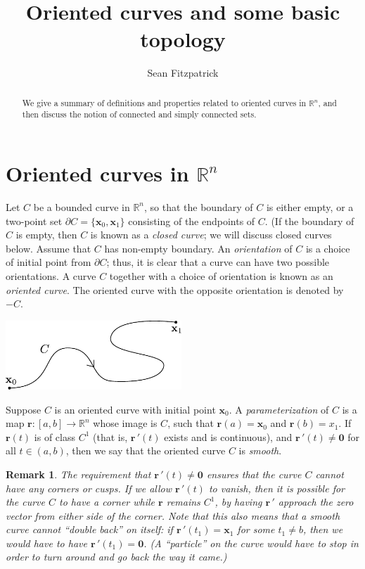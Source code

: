 \documentclass[12pt,letterpaper]{article}
\author{Sean Fitzpatrick}
\title{Oriented curves and some basic topology}
\newtheorem{rem}[theorem]{Remark}
\newenvironment{remark}{\begin{rem}\rm}{\end{rem}}
\newcommand{\R}{\mathbb{R}}
\newcommand{\x}{\mathbf{x}}
\renewcommand{\r}{\mathbf{r}}
\begin{document}
\maketitle
\begin{abstract}
We give a summary of definitions and properties related to oriented curves in $\R^n$, and then discuss the notion of connected and simply connected sets.
\end{abstract}
\section{Oriented curves in $\R^n$}
Let $C$ be a bounded curve in $\R^n$, so that the boundary of $C$ is either empty, or a two-point set $\partial C=\{\x_0,\x_1\}$ consisting of the endpoints of $C$. (If the boundary of $C$ is empty, then $C$ is known as a {\em closed curve}; we will discuss closed curves below. Assume that $C$ has non-empty boundary. An {\em orientation} of $C$ is a choice of initial point from $\partial C$; thus, it is clear that a curve can have two possible orientations. A curve $C$ together with a choice of orientation is known as an {\em oriented curve}. The oriented curve with the opposite orientation is denoted by $-C$.
\begin{center}
\includegraphics[width=2.6in]{oriented.pdf}
\end{center}
Suppose $C$ is an oriented curve with initial point $\x_0$. A {\em parameterization} of $C$ is a map $\mathbf{r}:[a,b]\to \R^n$ whose image is $C$, such that $\r(a)=\x_0$ and $\r(b)=x_1$. If $\r(t)$ is of class $C^1$ (that is, $\r\,'(t)$ exists and is continuous), and $\r\,'(t)\neq \mathbf{0}$ for all $t\in (a,b)$, then we say that the oriented curve $C$ is {\em smooth}.
\begin{remark}
The requirement that $\r\,'(t)\neq \mathbf{0}$ ensures that the curve $C$ cannot have any corners or cusps. If we allow $\r\,'(t)$ to vanish, then it is possible for the curve $C$ to have a corner while $\r$ remains $C^1$, by having $\r\,'$ approach the zero vector from either side of the corner. Note that this also means that a smooth curve cannot ``double back'' on itself: if $\r\,'(t_1)=\x_1$ for some $t_1\neq b$, then we would have to have $\r\,'(t_1)=\mathbf{0}$. (A ``particle'' on the curve would have to stop in order to turn around and go back the way it came.)
\end{remark}
\end{document}
